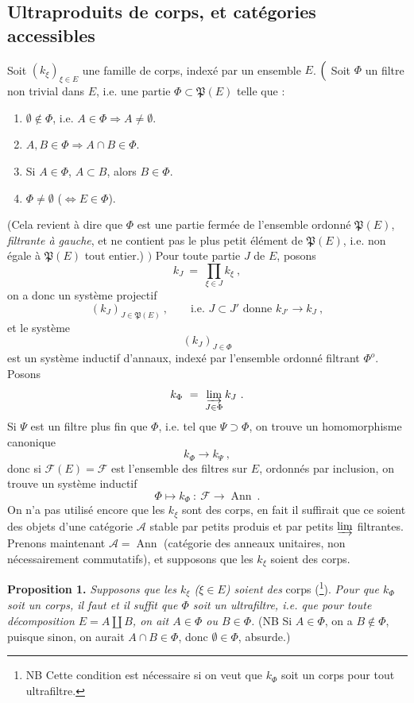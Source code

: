 \documentclass[11pt]{article}
\newcommand{\printedpage}[1]{\marginpar{\footnotesize p.~#1}}
\newcommand{\msp}[1]{\marginpar{\footnotesize [#1]}}
\newcommand{\cF}{\mathcal{F}}
\newcommand{\cA}{\mathcal{A}}
\newcommand{\Ann}{\operatorname{Ann}}
\begin{document}
\subsection*{Ultraproduits de corps, et catégories accessibles}

\noindent Soit $(k_\xi)_{\xi\in E}$ une famille de corps, indexé par un ensemble $E$. $\Bigl($ Soit $\Phi$ un filtre non trivial dans $E$, i.e. une partie $\Phi\subset\mathfrak{P}(E)$ telle que :
\begin{enumerate}
\item[a)] $\emptyset\notin\Phi$, i.e. $A\in\Phi\Longrightarrow A\neq\emptyset$.
\item[b)] $A,B\in\Phi\Longrightarrow A\cap B\in\Phi$.
\item[c)] Si $A\in\Phi$, $A\subset B$, alors $B\in\Phi$.
\item[d)] $\Phi\neq\emptyset$ ($\iff E\in\Phi$).
\end{enumerate}
(Cela revient à dire que $\Phi$ est une partie fermée de l'ensemble ordonné $\mathfrak{P}(E)$, \textit{filtrante à gauche}, et ne contient pas le plus petit élément de $\mathfrak{P}(E)$, i.e. non égale à $\mathfrak{P}(E)$ tout entier.) $\Bigr)$ Pour toute partie $J$ de $E$, posons
\[
k_J \ = \ \prod_{\xi\in J} k_\xi \ ,
\]
on a donc un système projectif
\[
(k_J)_{J\in\mathfrak{P}(E)} \ , \qquad \text{i.e. } J\subset J' \text{ donne } k_{J'}\longrightarrow k_J \ ,
\]
et le système
\[
(k_J)_{J\in\Phi}
\]
est un système inductif d'annaux, indexé par l'ensemble ordonné filtrant $\Phi^o$. Posons %
\[
k_\Phi \ = \ \varinjlim_{J\in\Phi} k_J \ .
\]
Si $\Psi$ est un filtre plus fin que $\Phi$, i.e.
\msp{page 2}
tel que $\Psi\supset\Phi$, on trouve un homomorphisme canonique
\[
k_\Phi \longrightarrow k_\Psi \ ,
\]
donc si $\cF(E)=\cF$ est l'ensemble des filtres sur $E$, ordonnés par inclusion, on trouve un système inductif
\[
\Phi \longmapsto k_\Phi \ : \ \cF \longrightarrow \Ann \ .
\]
On n'a pas utilisé encore que les $k_\xi$ sont des corps, en fait il suffirait que ce soient des objets d'une catégorie $\cA$ stable par petits produis et par petits $\varinjlim$ filtrantes. Prenons maintenant $\cA=\Ann$ (catégorie des anneaux unitaires, non nécessairement commutatifs), et supposons que les $k_\xi$ soient des corps. %

\printedpage{192}

\noindent\textbf{Proposition 1.} \textit{Supposons que les $k_\xi$ ($\xi\in E$) soient des} corps (\footnote[203]{NB Cette condition est nécessaire si on veut que $k_\Phi$ soit un corps pour tout ultrafiltre.}). \textit{Pour que $k_\Phi$ soit un corps, il faut et il suffit que $\Phi$ soit un ultrafiltre, i.e. que pour toute décomposition $E=A\amalg B$, on ait $A\in\Phi$ ou $B\in\Phi$.} (NB Si $A\in\Phi$, on a $B\notin\Phi$, puisque sinon, on aurait $A\cap B\in\Phi$, donc $\emptyset\in\Phi$, absurde.)
\end{document}
